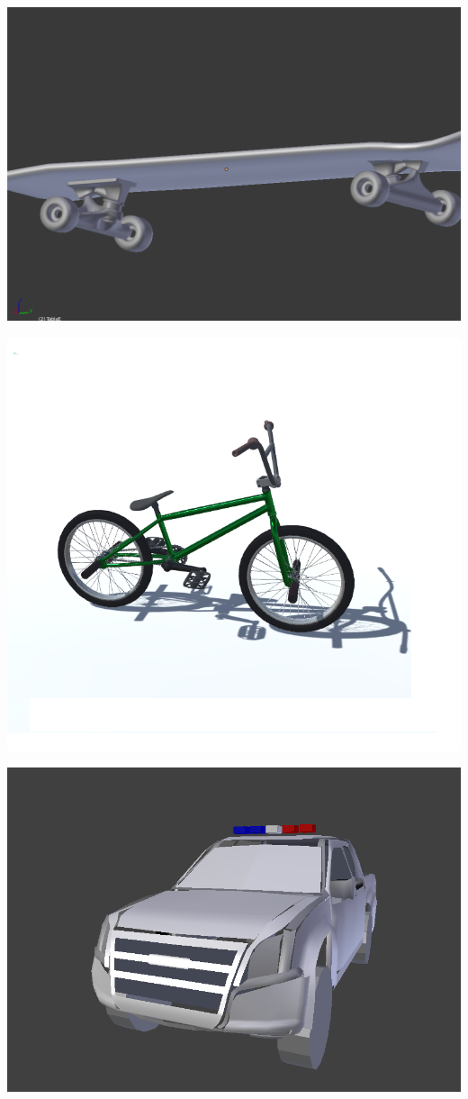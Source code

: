 \documentclass{article}
\begin{document}
  \includegraphics[width=\textwidth]{13.png}
  
  \includegraphics[width=\textwidth]{15.png}

  \includegraphics[width=\textwidth]{2.png}
  
\end{document}
